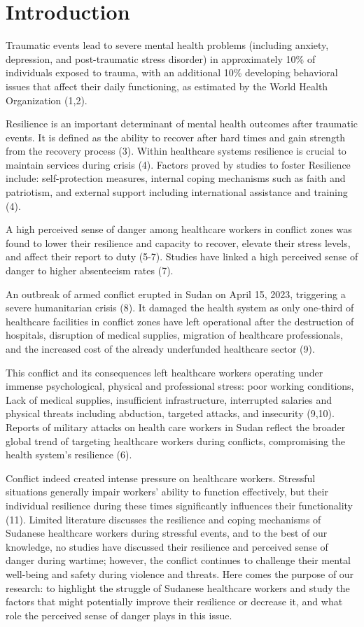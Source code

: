 \documentclass[12pt]{article}
\begin{document}
\section{Introduction}
Traumatic events lead to severe mental health problems (including anxiety, depression, and post-traumatic stress disorder) in approximately 10\% of individuals exposed to trauma, with an additional 10\% developing behavioral issues that affect their daily functioning, as estimated by the World Health Organization (1,2).

Resilience is an important determinant of mental health outcomes after traumatic events. It is defined as the ability to recover after hard times and gain strength from the recovery process (3). Within healthcare systems resilience is crucial to maintain services during crisis (4). Factors proved by studies to foster Resilience include: self-protection measures, internal coping mechanisms such as faith and patriotism, and external support including international assistance and training (4).

A high perceived sense of danger among healthcare workers in conflict zones was found to lower their resilience and capacity to recover, elevate their stress levels, and affect their report to duty (5-7). Studies have linked a high perceived sense of danger to higher absenteeism rates (7).

An outbreak of armed conflict erupted in Sudan on April 15, 2023, triggering a severe humanitarian crisis (8). It damaged the health system as only one-third of healthcare facilities in conflict zones have left operational after the destruction of hospitals, disruption of medical supplies, migration of healthcare professionals, and the increased cost of the already underfunded healthcare sector (9).

This conflict and its consequences left healthcare workers operating under immense psychological, physical and professional stress: poor working conditions, Lack of medical supplies, insufficient infrastructure, interrupted salaries and physical threats including abduction, targeted attacks, and insecurity (9,10). Reports of military attacks on health care workers in Sudan reflect the broader global trend of targeting healthcare workers during conflicts, compromising the health system’s resilience (6).

Conflict indeed created intense pressure on healthcare workers. Stressful situations generally impair workers’ ability to function effectively, but their individual resilience during these times significantly influences their functionality (11). Limited literature discusses the resilience and coping mechanisms of Sudanese healthcare workers during stressful events, and to the best of our knowledge, no studies have discussed their resilience and perceived sense of danger during wartime; however, the conflict continues to challenge their mental well-being and safety during violence and threats. Here comes the purpose of our research: to highlight the struggle of Sudanese healthcare workers and study the factors that might potentially improve their resilience or decrease it, and what role the perceived sense of danger plays in this issue.
\end{document}
